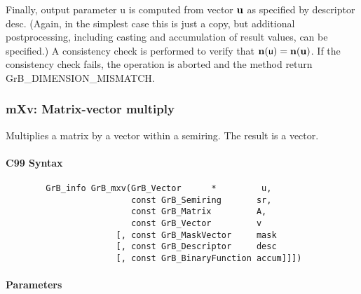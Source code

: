 Finally, output parameter {\sf u} is computed from vector ${\bf u}$
as specified by descriptor {\sf desc}. (Again, in the simplest case this
is just a copy, but additional postprocessing, including casting and
accumulation of result values, can be specified.)  A consistency check is
performed to verify that $\bold{n}({\sf u}) = \bold{n}({\bf u})$. If
the consistency check fails, the operation is aborted and the method
return {\sf GrB\_DIMENSION\_MISMATCH}.

 


\subsubsection{{\sf mXv}: Matrix-vector multiply}

Multiplies a matrix by a vector within a semiring. The result is a vector.

\paragraph{C99 Syntax}

\begin{verbatim}
        GrB_info GrB_mxv(GrB_Vector      *         u,
                         const GrB_Semiring       sr, 
                         const GrB_Matrix         A,
                         const GrB_Vector         v
                      [, const GrB_MaskVector     mask
                      [, const GrB_Descriptor     desc
                      [, const GrB_BinaryFunction accum]]])
\end{verbatim}

\paragraph{Parameters}

